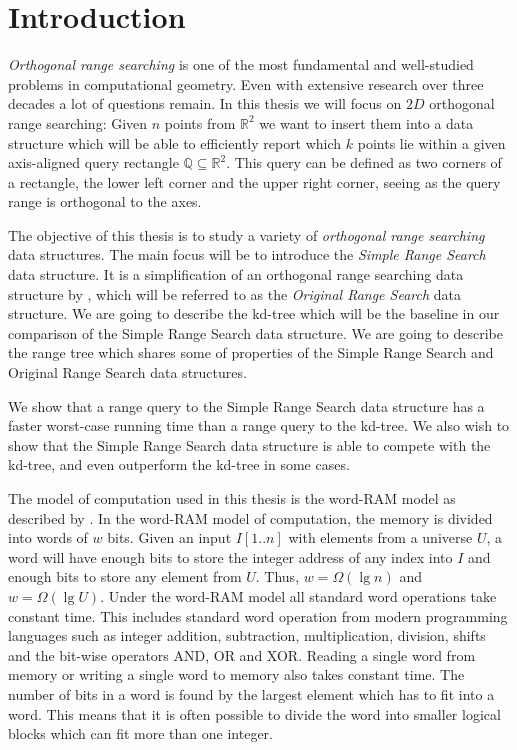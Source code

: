 \chapter{Introduction}
\label{ch:intro}

\noindent \emph{Orthogonal range searching} is one of the most fundamental and well-studied problems in computational geometry. Even with extensive research over three decades a lot of questions remain. In this thesis we will focus on $2D$ orthogonal range searching: Given $n$ points from $\mathbb{R}^2$ we want to insert them into a data structure which will be able to efficiently report which $k$ points lie within a given axis-aligned query rectangle $\mathbb{Q} \subseteq \mathbb{R}^2$. This query can be defined as two corners of a rectangle, the lower left corner and the upper right corner, seeing as the query range is orthogonal to the axes.

The objective of this thesis is to study a variety of \emph{orthogonal range searching} data structures. The main focus will be to introduce the \emph{Simple Range Search} data structure. It is a simplification of an orthogonal range searching data structure by \citet{chanetal}, which will be referred to as the \emph{Original Range Search} data structure. We are going to describe the kd-tree which will be the baseline  in our comparison of the Simple Range Search data structure. We are going to describe the range tree which shares some of properties of the Simple Range Search and Original Range Search data structures.

We show that a range query to the Simple Range Search data structure has a faster worst-case running time than a range query to the kd-tree. We also wish to show that the Simple Range Search data structure is able to compete with the kd-tree, and even outperform the kd-tree in some cases.  

The model of computation used in this thesis is the word-RAM model as described by \citet{wordram}. In the word-RAM model of computation, the memory is divided into words of $w$ bits. Given an input $I[1..n]$ with elements from a universe $U$, a word will have enough bits to store the integer address of any index into $I$ and enough bits to store any element from $U$. Thus, $w = \Omega(\lg n)$ and $w = \Omega(\lg U)$. Under the word-RAM model all standard word operations take constant time. This includes standard word operation from modern programming languages such as integer addition, subtraction, multiplication, division, shifts and the bit-wise operators AND, OR and XOR. Reading a single word from memory or writing a single word to memory also takes constant time. The number of bits in a word is found by the largest element which has to fit into a word. This means that it is often possible to divide the word into smaller logical blocks which can fit more than one integer.  \\


